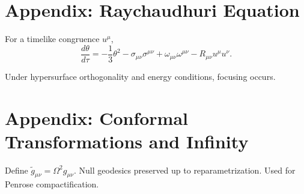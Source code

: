 \documentclass[12pt]{article}
\begin{document}
\section{Appendix: Raychaudhuri Equation}

For a timelike congruence $u^\mu$,
\[
\frac{d\theta}{d\tau}
= -\frac13\theta^2 - \sigma_{\mu\nu}\sigma^{\mu\nu}
+ \omega_{\mu\nu}\omega^{\mu\nu}
- R_{\mu\nu}u^\mu u^\nu.
\]

Under hypersurface orthogonality and energy conditions, focusing occurs.

\section{Appendix: Conformal Transformations and Infinity}

Define $\tilde{g}_{\mu\nu} = \Omega^2 g_{\mu\nu}$.  
Null geodesics preserved up to reparametrization.  
Used for Penrose compactification.

\end{document}

